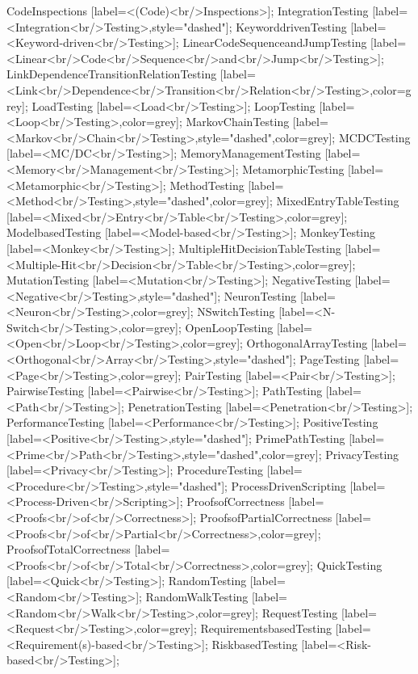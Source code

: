 \documentclass{article}
\begin{document}
{CodeInspections [label=<(Code)<br/>Inspections>];
IntegrationTesting [label=<Integration<br/>Testing>,style="dashed"];
KeyworddrivenTesting [label=<Keyword-driven<br/>Testing>];
LinearCodeSequenceandJumpTesting [label=<Linear<br/>Code<br/>Sequence<br/>and<br/>Jump<br/>Testing>];
LinkDependenceTransitionRelationTesting [label=<Link<br/>Dependence<br/>Transition<br/>Relation<br/>Testing>,color=grey];
LoadTesting [label=<Load<br/>Testing>];
LoopTesting [label=<Loop<br/>Testing>,color=grey];
MarkovChainTesting [label=<Markov<br/>Chain<br/>Testing>,style="dashed",color=grey];
MCDCTesting [label=<MC/DC<br/>Testing>];
MemoryManagementTesting [label=<Memory<br/>Management<br/>Testing>];
MetamorphicTesting [label=<Metamorphic<br/>Testing>];
MethodTesting [label=<Method<br/>Testing>,style="dashed",color=grey];
MixedEntryTableTesting [label=<Mixed<br/>Entry<br/>Table<br/>Testing>,color=grey];
ModelbasedTesting [label=<Model-based<br/>Testing>];
MonkeyTesting [label=<Monkey<br/>Testing>];
MultipleHitDecisionTableTesting [label=<Multiple-Hit<br/>Decision<br/>Table<br/>Testing>,color=grey];
MutationTesting [label=<Mutation<br/>Testing>];
NegativeTesting [label=<Negative<br/>Testing>,style="dashed"];
NeuronTesting [label=<Neuron<br/>Testing>,color=grey];
NSwitchTesting [label=<N-Switch<br/>Testing>,color=grey];
OpenLoopTesting [label=<Open<br/>Loop<br/>Testing>,color=grey];
OrthogonalArrayTesting [label=<Orthogonal<br/>Array<br/>Testing>,style="dashed"];
PageTesting [label=<Page<br/>Testing>,color=grey];
PairTesting [label=<Pair<br/>Testing>];
PairwiseTesting [label=<Pairwise<br/>Testing>];
PathTesting [label=<Path<br/>Testing>];
PenetrationTesting [label=<Penetration<br/>Testing>];
PerformanceTesting [label=<Performance<br/>Testing>];
PositiveTesting [label=<Positive<br/>Testing>,style="dashed"];
PrimePathTesting [label=<Prime<br/>Path<br/>Testing>,style="dashed",color=grey];
PrivacyTesting [label=<Privacy<br/>Testing>];
ProcedureTesting [label=<Procedure<br/>Testing>,style="dashed"];
ProcessDrivenScripting [label=<Process-Driven<br/>Scripting>];
ProofsofCorrectness [label=<Proofs<br/>of<br/>Correctness>];
ProofsofPartialCorrectness [label=<Proofs<br/>of<br/>Partial<br/>Correctness>,color=grey];
ProofsofTotalCorrectness [label=<Proofs<br/>of<br/>Total<br/>Correctness>,color=grey];
QuickTesting [label=<Quick<br/>Testing>];
RandomTesting [label=<Random<br/>Testing>];
RandomWalkTesting [label=<Random<br/>Walk<br/>Testing>,color=grey];
RequestTesting [label=<Request<br/>Testing>,color=grey];
RequirementsbasedTesting [label=<Requirement(s)-based<br/>Testing>];
RiskbasedTesting [label=<Risk-based<br/>Testing>];
}
\end{document}
